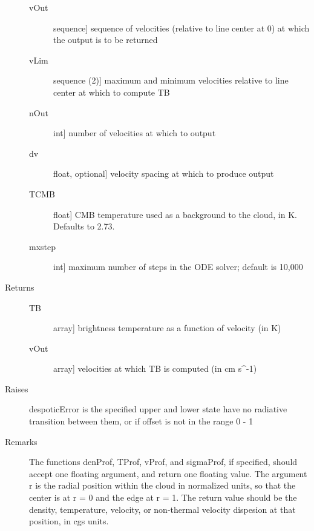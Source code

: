 \documentclass[letterpaper,10pt,english]{sphinxmanual}
\begin{document}
\begin{fulllineitems}
\begin{description}
\begin{description}
\item[{vOut}] \leavevmode{[}sequence{]}
sequence of velocities (relative to line center at 0) at
which the output is to be returned

\item[{vLim}] \leavevmode{[}sequence (2){]}
maximum and minimum velocities relative to line center at
which to compute TB

\item[{nOut}] \leavevmode{[}int{]}
number of velocities at which to output

\item[{dv}] \leavevmode{[}float, optional{]}
velocity spacing at which to produce output

\item[{TCMB}] \leavevmode{[}float{]}
CMB temperature used as a background to the cloud, in
K. Defaults to 2.73.

\item[{mxstep}] \leavevmode{[}int{]}
maximum number of steps in the ODE solver; default is
10,000

\end{description}

\item[{Returns}] \leavevmode\begin{description}
\item[{TB}] \leavevmode{[}array{]}
brightness temperature as a function of velocity (in K)

\item[{vOut}] \leavevmode{[}array{]}
velocities at which TB is computed (in cm s\textasciicircum{}-1)

\end{description}

\item[{Raises}] \leavevmode
despoticError is the specified upper and lower state have no
radiative transition between them, or if offset is not in the
range 0 - 1

\item[{Remarks}] \leavevmode
The functions denProf, TProf, vProf, and sigmaProf, if
specified, should accept one floating argument, and return one
floating value. The argument r is the radial position within
the cloud in normalized units, so that the center is at r = 0
and the edge at r = 1. The return value should be the density,
temperature, velocity, or non-thermal velocity dispesion at
that position, in cgs units.

\end{description}

\end{fulllineitems}
\end{document}
